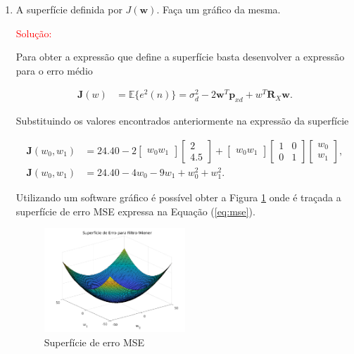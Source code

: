 \documentclass[a4paper,10pt]{article}
\begin{document}
\begin{enumerate}
\begin{enumerate}
					\item A superfície definida por $J(\mathbf{w})$. Faça um gráfico da mesma.
					
						\textcolor{red}{Solução:}
						
						Para obter a expressão que define a superfície basta desenvolver a expressão para o erro médio
						
						\begin{align}
							\mathbf{J}(w) &= \mathbb{E}\{e^{2}(n)\} = \sigma^{2}_{d} - 2\mathbf{w}^{T}\mathbf{p}_{xd} + w^{T}\mathbf{R}_{X}\mathbf{w}. \label{eq:mse}   
						\end{align}
						
						Substituindo os valores encontrados anteriormente na expressão da superfície
						
						\begin{align}
							\mathbf{J}(w_{0}, w_{1}) &= 24.40 - 2 \left[ \begin{matrix} w_{0}  w_{1} \end{matrix} \right] \left[ \begin{matrix} 2 \\ 4.5 \end{matrix} \right] + \left[ \begin{matrix} w_{0}  w_{1} \end{matrix} \right] \left[ \begin{matrix} 1 & 0 \\ 0 & 1 \end{matrix} \right]  \left[ \begin{matrix} w_{0}  \\ w_{1} \end{matrix} \right], \\
							\mathbf{J}(w_{0},w_{1}) &= 24.40 - 4w_{0} - 9w_{1} + w^{2}_{0} + w^{2}_{1}.
						\end{align}
						
						Utilizando um software gráfico é possível obter a Figura \ref{fig:01} onde é traçada a superfície de erro MSE expressa na Equação (\ref{eq:mse}).
					
						\begin{figure}[!ht]
							\centering
							\includegraphics[width=0.5\textwidth]{figs/superficie-de-erro.png}
							\caption{Superfície de erro MSE}
							\label{fig:01}
						\end{figure}
					
				\end{enumerate}
			
		\end{enumerate}
	
\end{document}

